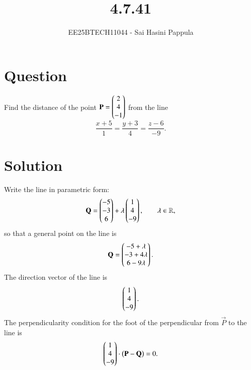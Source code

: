 \documentclass[journal]{IEEEtran}
\begin{document}

\vspace{3cm}

\title{4.7.41}
\author{EE25BTECH11044 - Sai Hasini Pappula}
 \maketitle
{\let\newpage\relax\maketitle}

\renewcommand{\thefigure}{\theenumi}
\renewcommand{\thetable}{\theenumi}
\setlength{\intextsep}{10pt} 

\renewcommand{\thetable}{\theenumi}
\section*{Question}
Find the distance of the point \(\mathbf{P}=\begin{pmatrix}2\\4\\-1\end{pmatrix}\) from the line
\begin{equation}
\frac{x+5}{1}=\frac{y+3}{4}=\frac{z-6}{-9}.
\end{equation}

\section*{Solution}
Write the line in parametric form:
\begin{equation}
\mathbf{Q}=\begin{pmatrix}-5\\-3\\6\end{pmatrix}+\lambda\begin{pmatrix}1\\4\\-9\end{pmatrix},\qquad \lambda\in\mathbb{R},
\end{equation}
so that a general point on the line is
\begin{equation}
\mathbf{Q}=\begin{pmatrix}-5+\lambda\\-3+4\lambda\\6-9\lambda\end{pmatrix}.
\end{equation}
The direction vector of the line is
\begin{equation}
\begin{pmatrix}1\\4\\-9\end{pmatrix}.
\end{equation}
The perpendicularity condition for the foot of the perpendicular from \(\vec{P}\) to the line is
\begin{equation}
\begin{pmatrix}1\\4\\-9\end{pmatrix}\cdot\big(\mathbf{P}-\mathbf{Q}\big)=0.
\end{equation}
\end{document}

